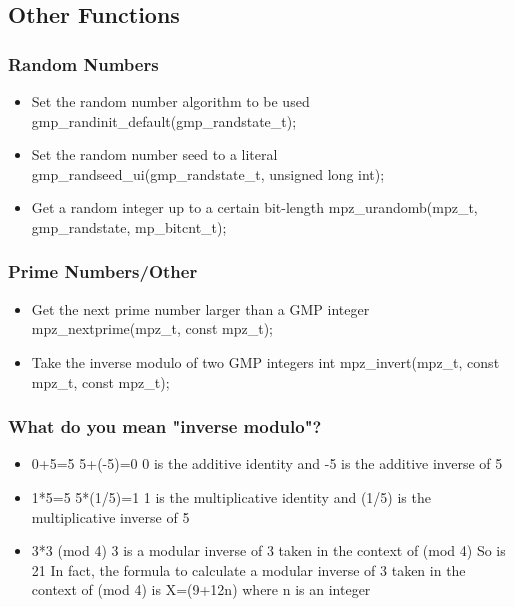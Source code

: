 \subsection{Other Functions}

\begin{frame}
\frametitle{Random Numbers}
  \begin{itemize}
    \item Set the random number algorithm to be used
    gmp\_randinit\_default(gmp\_randstate\_t);
    \item Set the random number seed to a literal
    gmp\_randseed\_ui(gmp\_randstate\_t, unsigned long int);
    \item Get a random integer up to a certain bit-length
    mpz\_urandomb(mpz\_t, gmp\_randstate, mp\_bitcnt\_t);
  \end{itemize}
\end{frame}

\begin{frame}
\frametitle{Prime Numbers/Other}
  \begin{itemize}
    \item Get the next prime number larger than a GMP integer
    mpz\_nextprime(mpz\_t, const mpz\_t);
    \item Take the inverse modulo of two GMP integers
    int mpz\_invert(mpz\_t, const mpz\_t, const mpz\_t);
  \end{itemize}
\end{frame}

\begin{frame}
\frametitle{What do you mean "inverse modulo"?}
  \begin{itemize}
    \item 0+5=5 5+(-5)=0
    0 is the additive identity and -5 is the additive inverse of 5
    \item 1*5=5 5*(1/5)=1
    1 is the multiplicative identity and (1/5) is the multiplicative inverse of 5
    \item 3*3  (mod 4)
    3 is a modular inverse of 3 taken in the context of (mod 4)
    So is 21
    In fact, the formula to calculate a modular inverse of 3 taken
    in the context of (mod 4) is X=(9+12n) where n is an integer
  \end{itemize}
\end{frame}
